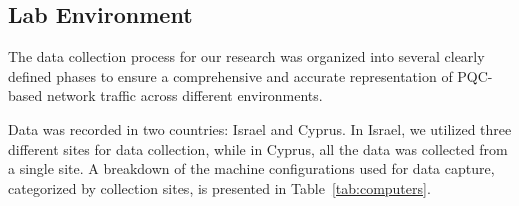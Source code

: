 \documentclass[10pt,journal]{IEEEtran}%
\begin{document}

\label{sec:data}
\subsection{Lab Environment} 

The data collection process for our research was organized into several clearly defined phases to ensure a comprehensive and accurate representation of PQC-based network traffic across different environments. 

Data was recorded in two countries: Israel and Cyprus. In Israel, we utilized three different sites for data collection, while in Cyprus, all the data was collected from a single site. A breakdown of the machine configurations used for data capture, categorized by collection sites, is presented in Table~\ref{tab:computers}.
\end{document}
